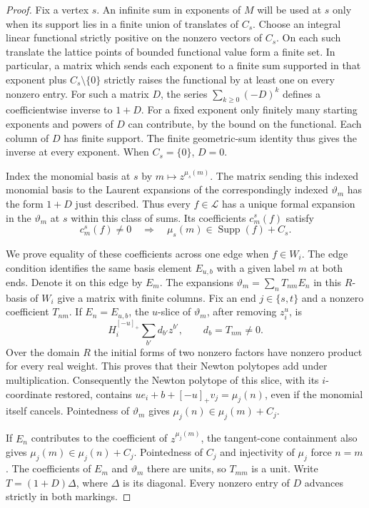 \documentclass[11pt,reqno]{amsart}
\numberwithin{equation}{section}
\theoremstyle{definition}
\theoremstyle{remark}
\DeclareMathOperator{\Supp}{Supp}
\begin{document}
\begin{proof}
Fix a vertex \(s\). An infinite sum in exponents of \(M\) will be used
at \(s\) only when its support lies in a finite union of translates of
\(C_s\). Choose an integral linear functional strictly positive on the
nonzero vectors of \(C_s\). On each such translate the lattice points of
bounded functional value form a finite set. In particular, a matrix which
sends each exponent to a finite sum supported in that exponent plus
\(C_s\setminus\{0\}\) strictly raises the functional by at least one on
every nonzero entry. For such a matrix \(D\), the series
\(\sum_{k\ge0}(-D)^k\) defines a coefficientwise inverse to \(1+D\).
For a fixed exponent only finitely many starting exponents and powers
of \(D\) can contribute, by the bound on the functional. Each column
of \(D\) has finite support. The finite geometric-sum identity thus
gives the inverse at every exponent. When \(C_s=\{0\}\), \(D=0\).

Index the monomial basis at \(s\) by \(m\mapsto z^{\mu_s(m)}\).
The matrix sending this indexed monomial basis to the Laurent expansions
of the correspondingly indexed \(\vartheta_m\) has the form \(1+D\)
just described. Thus every \(f\in \mathcal L\) has a unique formal expansion in
the \(\vartheta_m\) at \(s\) within this class of sums. Its coefficients
\(c^s_m(f)\) satisfy
\[ c^s_m(f)\ne0\quad\Longrightarrow\quad \mu_s(m)\in\Supp(f)+C_s . \]

We prove equality of these coefficients across one edge when \(f\in W_i\).
The edge condition identifies the same basis element \(E_{u,b}\) with
a given label \(m\) at both ends. Denote it on this edge by \(E_m\).
The expansions \(\vartheta_m=\sum_n T_{nm}E_n\) in this \(R\)-basis
of \(W_i\) give a matrix with finite columns.
Fix an end \(j\in\{s,t\}\) and a nonzero coefficient \(T_{nm}\).
If \(E_n=E_{u,b}\), the \(u\)-slice of \(\vartheta_m\), after removing
\(z_i^u\), is
\[ H_i^{[-u]_+}\sum_{b'}d_{b'}z^{b'}, \qquad d_b=T_{nm}\ne0 . \]
Over the domain \(R\) the initial forms of two nonzero factors have
nonzero product for every real weight. This proves that their Newton
polytopes add under multiplication. Consequently the Newton polytope of
this slice, with its \(i\)-coordinate restored, contains
\(u e_i+b+[-u]_+v_j=\mu_j(n)\), even if the monomial itself cancels.
Pointedness of \(\vartheta_m\) gives
\(\mu_j(n)\in\mu_j(m)+C_j\).

If \(E_n\) contributes to the coefficient of \(z^{\mu_j(m)}\), the
tangent-cone containment also gives \(\mu_j(m)\in\mu_j(n)+C_j\).
Pointedness of \(C_j\) and injectivity of \(\mu_j\) force \(n=m\).
The coefficients of \(E_m\) and \(\vartheta_m\) there are units,
so \(T_{mm}\) is a unit. Write \(T=(1+D)\Delta\), where \(\Delta\)
is its diagonal. Every nonzero entry of \(D\) advances strictly in both
markings.


\end{proof}
\end{document}
